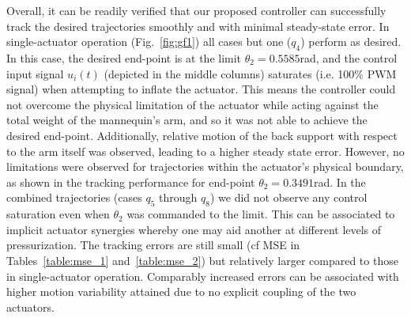 \documentclass[letterpaper, 10pt, conference]{ieeeconf}      %
\newcommand{\changed}[1]{{\color{red}{#1}}}
\begin{document}
Overall, it can be readily verified that our proposed controller can successfully track the desired trajectories smoothly and with minimal steady-state error. In single-actuator operation (Fig.~\ref{fig:gf1}) all cases but one ($q_4$) perform as desired. In this case, the desired end-point is at the limit $\theta_2=0.5585$\;rad, and the control input signal $u_i(t)$ (depicted in the middle columns) saturates (i.e. 100\% PWM signal) when attempting to inflate the actuator. This means the controller could not overcome the physical limitation of the actuator while acting against the total weight of the mannequin's arm, and so it was not able to achieve the desired end-point. Additionally, relative motion of the back support with respect to the arm itself was observed, leading to a higher steady state error. However, no limitations were observed for trajectories within the actuator's physical boundary, as shown in the tracking performance for end-point $ \theta_2=0.3491$\;rad. In the combined trajectories (cases $q_5$ through $q_8$) we did not observe any control saturation even when $\theta_2$ was commanded to the limit. This can be associated to implicit actuator synergies whereby one may aid another at different levels of pressurization. The tracking errors are still small (cf MSE in Tables~\ref{table:mse_1} and~\ref{table:mse_2}) but relatively larger compared to those in single-actuator operation. Comparably increased errors can be associated with higher motion variability attained due to no explicit coupling of the two actuators. 


\end{document}
